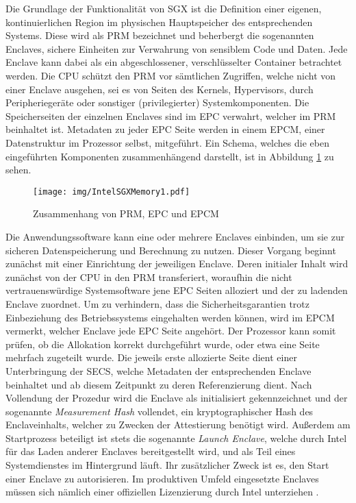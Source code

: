 Die Grundlage der Funktionalität von \ac{SGX} ist die Definition einer eigenen, kontinuierlichen Region im physischen Hauptspeicher des entsprechenden Systems. Diese wird als \ac{PRM} bezeichnet und beherbergt die sogenannten Enclaves, sichere Einheiten zur Verwahrung von sensiblem Code und Daten. Jede Enclave kann dabei als ein abgeschlossener, verschlüsselter Container betrachtet werden. Die \ac{CPU} schützt den \ac{PRM} vor sämtlichen Zugriffen, welche nicht von einer Enclave ausgehen, sei es von Seiten des Kernels, Hypervisors, durch Peripheriegeräte oder sonstiger (privilegierter) Systemkomponenten. Die Speicherseiten der einzelnen Enclaves sind im \ac{EPC} verwahrt, welcher im PRM beinhaltet ist. Metadaten zu jeder \ac{EPC} Seite werden in einem \ac{EPCM}, einer Datenstruktur im Prozessor selbst, mitgeführt. Ein Schema, welches die eben eingeführten Komponenten zusammenhängend darstellt, ist in Abbildung \ref{fig:intelsgxmemory1} zu sehen.

\begin{figure}
	\texttt{[image: img/IntelSGXMemory1.pdf]}
	\centering
	\caption{Zusammenhang von PRM, EPC und EPCM}
	\label{fig:intelsgxmemory1}
\end{figure}

Die Anwendungssoftware kann eine oder mehrere Enclaves einbinden, um sie zur sicheren Datenspeicherung und Berechnung zu nutzen. Dieser Vorgang beginnt zunächst mit einer Einrichtung der jeweiligen Enclave. Deren initialer Inhalt wird zunächst von der \ac{CPU} in den \ac{PRM} transferiert, woraufhin die nicht vertrauenswürdige Systemsoftware jene \ac{EPC} Seiten alloziert und der zu ladenden Enclave zuordnet. Um zu verhindern, dass die Sicherheitsgarantien trotz Einbeziehung des Betriebssystems eingehalten werden können, wird im \ac{EPCM} vermerkt, welcher Enclave jede EPC Seite angehört. Der Prozessor kann somit prüfen, ob die Allokation korrekt durchgeführt wurde, oder etwa eine Seite mehrfach zugeteilt wurde. Die jeweils erste allozierte Seite dient einer Unterbringung der \ac{SECS}, welche Metadaten der entsprechenden Enclave beinhaltet und ab diesem Zeitpunkt zu deren Referenzierung dient. Nach Vollendung der Prozedur wird die Enclave als initialisiert gekennzeichnet und der sogenannte \textit{Measurement Hash} vollendet, ein kryptographischer Hash des Enclaveinhalts, welcher zu Zwecken der Attestierung benötigt wird. Außerdem am Startprozess beteiligt ist stets die sogenannte \textit{Launch Enclave}, welche durch Intel für das Laden anderer Enclaves bereitgestellt wird, und als Teil eines Systemdienstes im Hintergrund läuft. Ihr zusätzlicher Zweck ist es, den Start einer Enclave zu autorisieren. Im produktiven Umfeld eingesetzte Enclaves müssen sich nämlich einer offiziellen Lizenzierung durch Intel unterziehen \cite{Costan2016}.

